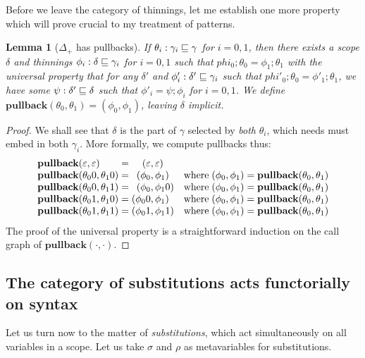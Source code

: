 \documentclass{jfp1}
\newtheorem{lemma}[theorem]{Lemma}
\newcommand{\emp}{\varepsilon}
\begin{document}
Before we leave the category of thinnings, let me establish one more property which
will prove crucial to my treatment of patterns.

\newcommand{\pb}[2]{\textbf{pullback}(#1,#2)}
\begin{lemma}[$\Delta_+$ has pullbacks]
  If $\theta_i : \gamma_i\sqsubseteq\gamma$ for $i=0,1$, then there exists a scope $\delta$ and
  thinnings $\phi_i : \delta\sqsubseteq\gamma_i$ for $i=0,1$ such that
  $phi_0;\theta_0 = \phi_1;\theta_1$ with the universal property that
  for any $\delta'$ and $\phi'_i : \delta'\sqsubseteq\gamma_i$ such that
  $phi'_0;\theta_0 = \phi'_1;\theta_1$, we have some $\psi : \delta'\sqsubseteq\delta$ such that
  $\phi'_i = \psi;\phi_i$ for $i=0,1$. We define $\pb{\theta_0}{\theta_1} = (\phi_0,\phi_1)$,
  leaving $\delta$ implicit.
\end{lemma}
\begin{proof}
  We shall see that $\delta$ is the part of $\gamma$ selected by \emph{both} $\theta_i$,
  which needs must embed in both $\gamma_i$. More formally, we compute pullbacks thus:
  \[\begin{array}{l@{\;=\;}r@{,\,}ll}
    \pb{\emp}{\emp} & (\emp&\emp) & \\
    \pb{\theta_00}{\theta_10} & (\phi_0&\phi_1)
      & \mbox{where}\;(\phi_0,\phi_1) = \pb{\theta_0}{\theta_1} \\                                     
    \pb{\theta_00}{\theta_11} & (\phi_0&\phi_10)
      & \mbox{where}\;(\phi_0,\phi_1) = \pb{\theta_0}{\theta_1} \\
    \pb{\theta_01}{\theta_10} & (\phi_00&\phi_1)
      & \mbox{where}\;(\phi_0,\phi_1) = \pb{\theta_0}{\theta_1} \\
    \pb{\theta_01}{\theta_11} & (\phi_01&\phi_11)
      & \mbox{where}\;(\phi_0,\phi_1) = \pb{\theta_0}{\theta_1} \\
    \end{array}\]
  The proof of the universal property is a straightforward induction on the call graph
  of $\pb\cdot\cdot$.
\end{proof}



\subsection{The category of substitutions acts functorially on syntax}

Let us turn now to the matter of \emph{substitutions}, which act simultaneously on all variables
in a scope. Let us take $\sigma$ and $\rho$ as metavariables for substitutions.
\end{document}
